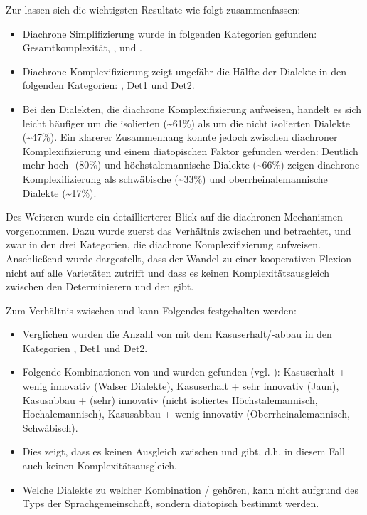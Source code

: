Zur  lassen sich die wichtigsten Resultate wie folgt zusammenfassen:

\begin{itemize}
\item
Diachrone Simplifizierung wurde in folgenden Kategorien gefunden: Gesamtkomplexität, ,  und .
\item
Diachrone Komplexifizierung zeigt ungefähr die Hälfte der Dialekte in den folgenden Kategorien: , Det1 und Det2.
\item
Bei den Dialekten, die diachrone Komplexifizierung aufweisen, handelt es sich leicht häufiger um die isolierten ({\textasciitilde}61\%) als um die nicht isolierten Dialekte ({\textasciitilde}47\%). Ein klarerer Zusammenhang konnte jedoch zwischen diachroner Komplexifizierung und einem diatopischen Faktor gefunden werden: Deutlich mehr hoch- (80\%) und höchstalemannische Dialekte ({\textasciitilde}66\%) zeigen diachrone Komplexifizierung als schwäbische ({\textasciitilde}33\%) und oberrheinalemannische Dialekte ({\textasciitilde}17\%).
\end{itemize}

Des Weiteren wurde ein detaillierterer Blick auf die diachronen Mechanismen vorgenommen. Dazu wurde zuerst das Verhältnis zwischen  und  betrachtet, und zwar in den drei Kategorien, die diachrone Komplexifizierung aufweisen. Anschließend wurde dargestellt, dass der Wandel zu einer kooperativen Flexion nicht auf alle Varietäten zutrifft und dass es keinen Komplexitätsausgleich zwischen den Determinierern und den  gibt.

Zum Verhältnis zwischen  und  kann Folgendes festgehalten werden:

\begin{itemize}
\item
Verglichen wurden die Anzahl von  mit dem Kasuserhalt/-abbau in den Kategorien , Det1 und Det2.
\item
Folgende Kombinationen von  und  wurden gefunden (vgl. ): Kasuserhalt + wenig innovativ (Walser Dialekte), Kasuserhalt + sehr innovativ (Jaun), Kasusabbau + (sehr) innovativ (nicht isoliertes Höchstalemannisch, Hochalemannisch), Kasusabbau + wenig innovativ (Oberrheinalemannisch, Schwäbisch).
\item
Dies zeigt, dass es keinen Ausgleich zwischen  und  gibt, d.h. in diesem Fall auch keinen Komplexitätsausgleich.
\item
Welche Dialekte zu welcher Kombination / gehören, kann nicht aufgrund des Typs der Sprachgemeinschaft, sondern diatopisch bestimmt werden.
\end{itemize}

